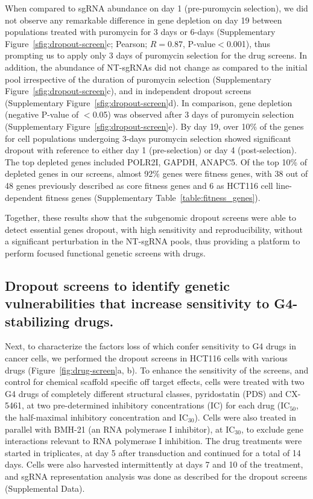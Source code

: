 When compared to sgRNA abundance on day 1 (pre-puromycin selection), we did not observe any remarkable difference in gene depletion on day 19 between populations treated with puromycin for 3 days or 6-days (Supplementary Figure~\ref{sfig:dropout-screen}c; Pearson; $R=0.87$, P-value$<$0.001), thus prompting us to apply only 3 days of puromycin selection for the drug screens. 
In addition, the abundance of NT-sgRNAs did not change as compared to the initial pool irrespective of the duration of puromycin selection (Supplementary Figure~\ref{sfig:dropout-screen}c), and in independent dropout screens (Supplementary Figure~\ref{sfig:dropout-screen}d). In comparison, gene depletion (negative P-value of $<$0.05) was observed after 3 days of puromycin selection (Supplementary Figure~\ref{sfig:dropout-screen}e). By day 19, over 10\% of the genes for cell populations undergoing 3-days puromycin selection showed significant dropout with reference to either day 1 (pre-selection) or day 4 (post-selection). The top depleted genes included POLR2I, GAPDH, ANAPC5. Of the top 10\% of depleted genes in our screens, almost 92\% genes were fitness genes, with 38 out of 48 genes previously described as core fitness genes and 6 as HCT116 cell line-dependent fitness genes (Supplementary Table~\ref{table:fitness_genes})\cite{Hart2015}.

Together, these results show that the subgenomic dropout screens were able to detect essential genes dropout, with high sensitivity and reproducibility, without a significant perturbation in the NT-sgRNA pools, thus providing a platform to perform focused functional genetic screens with drugs. 

\subsection{Dropout screens to identify genetic vulnerabilities that increase sensitivity to G4-stabilizing drugs.}
Next, to characterize the factors loss of which confer sensitivity to G4 drugs in cancer cells, we performed the dropout screens in HCT116 cells with various drugs (Figure~\ref{fig:drug-screen}a, b). 
To enhance the sensitivity of the screens, and control for chemical scaffold specific off target effects, cells were treated with two G4 drugs of completely different structural classes, pyridostatin (PDS) and CX-5461, at two pre-determined inhibitory concentrations (IC) for each drug (IC$_{50}$, the half-maximal inhibitory concentration and IC$_{30}$). 
Cells were also treated in parallel with BMH-21 (an RNA polymerase I inhibitor), at IC$_{30}$, to exclude gene interactions relevant to RNA polymerase I inhibition. 
The drug treatments were started in triplicates, at day 5 after transduction and continued for a total of 14 days. Cells were also harvested intermittently at days 7 and 10 of the treatment, and sgRNA representation analysis was done as described for the dropout screens (Supplemental Data).  


